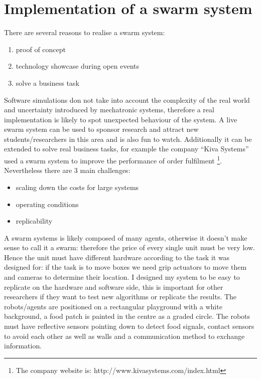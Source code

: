 \section{Implementation of a swarm system}
\label{Appendix:RobotSystem}
There are several reasons to realise a swarm system:
\begin{enumerate}
 \item proof of concept
 \item technology showcase during open events
 \item solve a business task
\end{enumerate}
Software simulations don not take into account the complexity of the real world
and uncertainty introduced by mechatronic systems, therefore a real implementation
 is likely to spot unexpected behaviour of the system.
A live swarm system can be used to sponsor research and attract new students/researchers
 in this area and is also fun to watch.
Additionally it can be extended to solve real business tasks, for example the
company ``Kiva Systems'' used a swarm system to improve the performance
of order fulfilment \footnote{The company website is: http://www.kivasystems.com/index.html}.
Nevertheless there are 3 main challenges:
\begin{itemize}
 \item scaling down the costs for large systems
 \item operating conditions
 \item replicability
\end{itemize}
A swarm systems is likely composed of many agents, otherwise it doesn't make
sense to call it a swarm: therefore the price of every single unit must be very low.
Hence the unit must have different hardware according to the task it was designed for:
if the task is to move boxes we need grip actuators to move them and
cameras to determine their location.
I designed my system to be easy to replicate on the hardware and software side,
this is important for other researchers if they want to test new algorithms or
replicate the results.
The robots/agents are positioned on a rectangular playground with a white background,
 a food patch is painted in the centre as a graded circle. The robots must have
reflective sensors pointing down to detect food signals, contact sensors to avoid
each other as well as walls and a communication method to exchange information.

